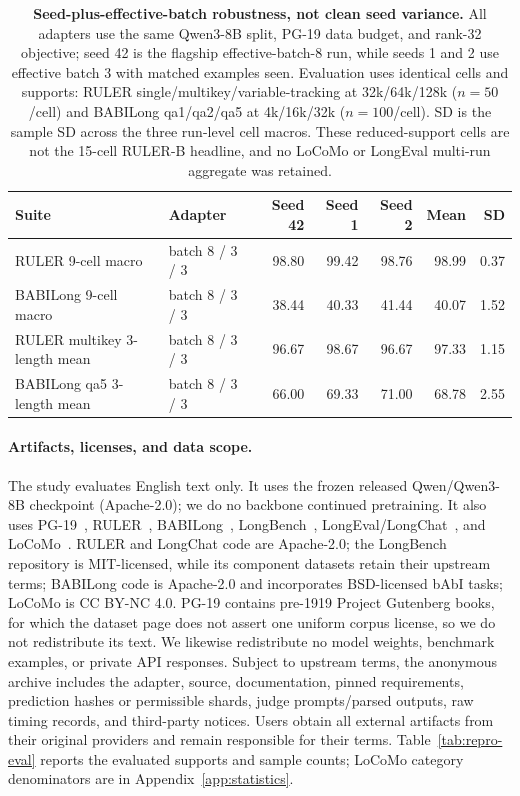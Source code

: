 \begin{table}[t]
\centering
\scriptsize
\setlength{\tabcolsep}{4pt}
\begin{tabular}{@{}llrrrrr@{}}
\toprule
\textbf{Suite} & \textbf{Adapter} & \textbf{Seed 42} & \textbf{Seed 1} &
\textbf{Seed 2} & \textbf{Mean} & \textbf{SD} \\
\midrule
RULER 9-cell macro & batch 8 / 3 / 3 & 98.80 & 99.42 & 98.76 & 98.99 & 0.37 \\
BABILong 9-cell macro & batch 8 / 3 / 3 & 38.44 & 40.33 & 41.44 & 40.07 & 1.52 \\
\midrule
RULER multikey 3-length mean & batch 8 / 3 / 3 & 96.67 & 98.67 & 96.67 & 97.33 & 1.15 \\
BABILong qa5 3-length mean & batch 8 / 3 / 3 & 66.00 & 69.33 & 71.00 & 68.78 & 2.55 \\
\bottomrule
\end{tabular}
\caption{\textbf{Seed-plus-effective-batch robustness, not clean seed
variance.} All adapters use the same Qwen3-8B split, PG-19 data budget, and
rank-32 objective; seed 42 is the flagship effective-batch-8 run, while seeds
1 and 2 use effective batch 3 with matched examples seen. Evaluation uses
identical cells and supports: RULER single/multikey/variable-tracking at
32k/64k/128k ($n{=}50$/cell) and BABILong qa1/qa2/qa5 at
4k/16k/32k ($n{=}100$/cell). SD is the sample SD across the three run-level
cell macros. These reduced-support cells are not the 15-cell RULER-B headline,
and no LoCoMo or LongEval multi-run aggregate was retained.}
\label{tab:seed-batch-robustness}
\end{table}

\paragraph{Artifacts, licenses, and data scope.}
The study evaluates English text only. It uses the frozen released
Qwen/Qwen3-8B checkpoint (Apache-2.0); we do no backbone continued pretraining.
It also uses PG-19~\citep{pg19}, RULER~\citep{ruler}, BABILong~\citep{babilong},
LongBench~\citep{longbench}, LongEval/LongChat~\citep{longchat}, and
LoCoMo~\citep{locomo}. RULER and LongChat code are Apache-2.0; the LongBench
repository is MIT-licensed, while its component datasets retain their upstream
terms; BABILong code is Apache-2.0 and incorporates BSD-licensed bAbI tasks;
LoCoMo is CC BY-NC 4.0. PG-19 contains pre-1919 Project Gutenberg books, for
which the dataset page does not assert one uniform corpus license, so we do not
redistribute its text. We likewise redistribute no model weights, benchmark
examples, or private API responses. Subject to upstream terms, the anonymous
archive includes the adapter, source, documentation, pinned requirements,
prediction hashes or permissible shards, judge prompts/parsed outputs, raw
timing records, and third-party notices. Users obtain all external artifacts
from their original providers and remain
responsible for their terms. Table~\ref{tab:repro-eval} reports the evaluated
supports and sample counts; LoCoMo category denominators are in
Appendix~\ref{app:statistics}.

